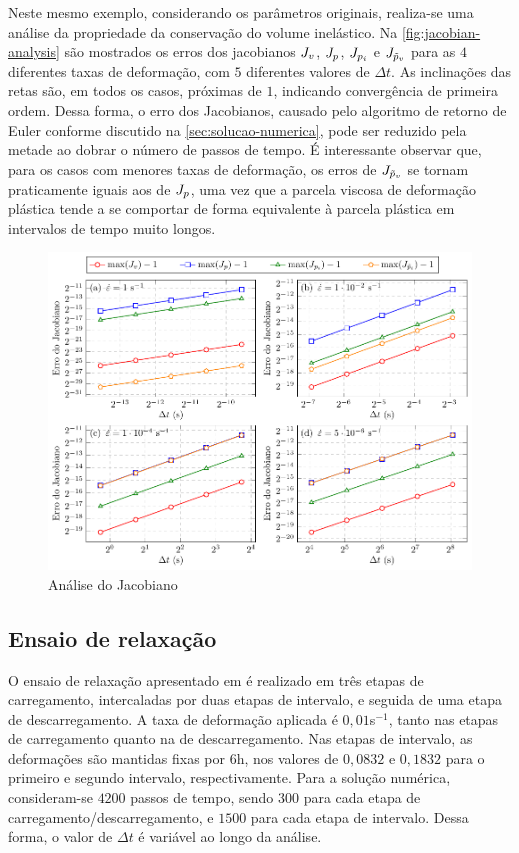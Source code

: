 \documentclass[Tese.tex]{subfiles}
\begin{document}
{Neste mesmo exemplo, considerando os parâmetros originais, realiza-se uma análise da propriedade da conservação do volume inelástico. Na \autoref{fig:jacobian-analysis} são mostrados os erros dos jacobianos $J_v$, $J_p$, $J_{p_i}$ e $J_{\tilde{p}_v}$ para as $4$ diferentes taxas de deformação, com $5$ diferentes valores de $\Delta t$. As inclinações das retas são, em todos os casos, próximas de $1$, indicando convergência de primeira ordem. Dessa forma, o erro dos Jacobianos, causado pelo algoritmo de retorno de Euler conforme discutido na \autoref{sec:solucao-numerica}, pode ser reduzido pela metade ao dobrar o número de passos de tempo. É interessante observar que, para os casos com menores taxas de deformação, os erros de $J_{\tilde{p}_v}$ se tornam praticamente iguais aos de $J_p$, uma vez que a parcela viscosa de deformação plástica tende a se comportar de forma equivalente à parcela plástica em intervalos de tempo muito longos.

\begin{figure}[!h]
	\centering
	\caption{Análise do Jacobiano}
	\label{fig:jacobian-analysis}
	\includegraphics[scale=1.0]{Figuras/PTFE/Jacobian-analysis.pdf}		
\end{figure}

\subsection{Ensaio de relaxação}\label{subsec:ptfe-relaxation}

O ensaio de relaxação apresentado em  é realizado em três etapas de carregamento, intercaladas por duas etapas de intervalo, e seguida de uma etapa de descarregamento. A taxa de deformação aplicada é $0,01$s$^{-1}$, tanto nas etapas de carregamento quanto na de descarregamento. Nas etapas de intervalo, as deformações são mantidas fixas por $6$h, nos valores de $0,0832$ e $0,1832$ para o primeiro e segundo intervalo, respectivamente. Para a solução numérica, consideram-se $4200$ passos de tempo, sendo $300$ para cada etapa de carregamento/descarregamento, e $1500$ para cada etapa de intervalo. Dessa forma, o valor de $\Delta t$ é variável ao longo da análise.

}
\end{document}
